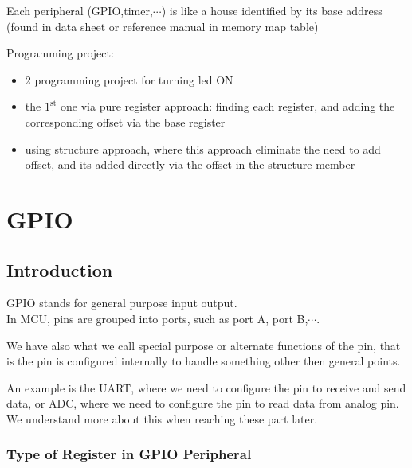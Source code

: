 \documentclass[12pt,a4paper]{book}
\begin{document}
\item  Each peripheral (GPIO,timer,$\cdots$) is like a house identified by its base address (found in data sheet or reference manual in memory map table)

\item  Programming project:

    \begin{itemize}
        \item 2 programming project for turning led ON

        \item the $\mathrm{1}^\mathrm{st}$ one via pure register approach: finding each register, and adding the corresponding offset via the base register

        \item  using structure approach, where this approach eliminate the need to add offset, and its added directly via the offset in the structure member

            
        
    \end{itemize}




\chapter{GPIO}

\section{Introduction}

GPIO stands for general purpose input output.\\

In MCU, pins are grouped into ports, such as port A, port B,$\cdots$.


We have also what we call special purpose or alternate functions of the pin, that is the pin is configured internally to handle something other then general points.

An example is the UART, where we need to configure the pin to receive and send data, or ADC, where we need to configure the pin to read data from analog pin.
We understand more about this when reaching these part later.

\subsection{Type of Register in GPIO Peripheral}
\end{document}

